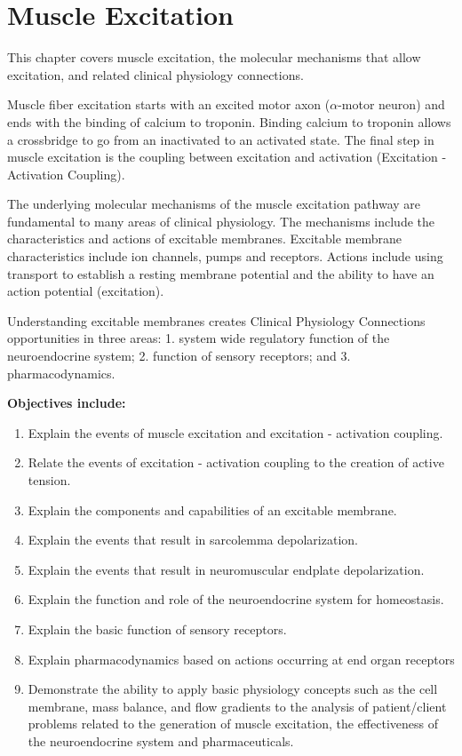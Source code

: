 \chapter{Muscle Excitation}\label{chp:excitation}



\minitoc

This chapter covers muscle excitation, the molecular mechanisms that allow excitation, and related clinical physiology connections. 

Muscle fiber excitation starts with an excited motor axon ($\alpha$-motor neuron) and ends with the binding of calcium to troponin. Binding calcium to troponin allows a crossbridge to go from an inactivated to an activated state. The final step in muscle excitation is the coupling between excitation and activation (Excitation - Activation Coupling). 

The underlying molecular mechanisms of the muscle excitation pathway are fundamental to many areas of clinical physiology. The mechanisms include the characteristics and actions of excitable membranes. Excitable membrane characteristics include ion channels, pumps and receptors. Actions include using transport to establish a resting membrane potential and the ability to have an action potential (excitation). 

Understanding excitable membranes creates Clinical Physiology Connections opportunities in three areas: 1. system wide regulatory function of the neuroendocrine system; 2. function of sensory receptors; and 3. pharmacodynamics.

\vspace{5mm}

\textbf{Objectives include:}
\begin{enumerate}
    \item Explain the events of muscle excitation and excitation - activation coupling.
    \item Relate the events of excitation - activation coupling to the creation of active tension.
\item Explain the components and capabilities of an excitable membrane.
    \item Explain the events that result in sarcolemma depolarization.
   \item Explain the events that result in neuromuscular endplate depolarization.
    \item Explain the function and role of the neuroendocrine system for homeostasis.
\item Explain the basic function of sensory receptors.
    \item Explain pharmacodynamics based on actions occurring at end organ receptors
   \item Demonstrate the ability to apply basic physiology concepts such as the cell membrane, mass balance, and flow gradients to the analysis of patient/client problems related to the generation of muscle excitation, the effectiveness of the neuroendocrine system and pharmaceuticals.
\end{enumerate}

